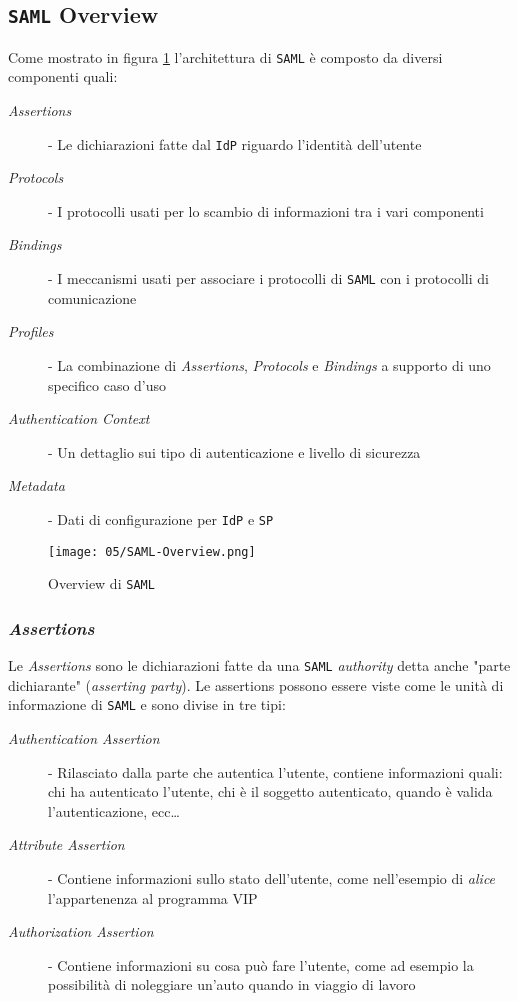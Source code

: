     \subsection{\texttt{SAML} Overview}
        Come mostrato in figura \ref{fig:saml-overview} l'architettura di \texttt{SAML} è composto da diversi componenti quali:
        \begin{description}
            \item[\textit{Assertions}] - Le dichiarazioni fatte dal \texttt{IdP} riguardo l'identità dell'utente
            \item[\textit{Protocols}] - I protocolli usati per lo scambio di informazioni tra i vari componenti
            \item[\textit{Bindings}] - I meccanismi usati per associare i protocolli di \texttt{SAML} con i protocolli di comunicazione
            \item[\textit{Profiles}] - La combinazione di \textit{Assertions}, \textit{Protocols} e \textit{Bindings} a supporto di uno specifico caso d'uso
            \item[\textit{Authentication Context}] - Un dettaglio sui tipo di autenticazione e livello di sicurezza
            \item[\textit{Metadata}] - Dati di configurazione per \texttt{IdP} e \texttt{SP}
        \end{description}
        \begin{figure}[H]
            \label{fig:saml-overview}
            \centering
            \texttt{[image: 05/SAML-Overview.png]}
            \caption{Overview di \texttt{SAML}}
        \end{figure}
        \subsubsection{\textit{Assertions}}
            Le \textit{Assertions} sono le dichiarazioni fatte da una \texttt{SAML} \textit{authority} detta anche "parte dichiarante" (\textit{asserting party}). Le assertions possono essere viste come le unità di informazione di \texttt{SAML} e sono divise in tre tipi:
            \begin{description}
                \item[\textit{Authentication Assertion}] - Rilasciato dalla parte che autentica l'utente, contiene informazioni quali: chi ha autenticato l'utente, chi è il soggetto autenticato, quando è valida l'autenticazione, ecc\dots
                \item[\textit{Attribute Assertion}] - Contiene informazioni sullo stato dell'utente, come nell'esempio di \textit{alice} l'appartenenza al programma VIP
                \item[\textit{Authorization Assertion}] - Contiene informazioni su cosa può fare l'utente, come ad esempio la possibilità di noleggiare un'auto quando in viaggio di lavoro
            \end{description}
